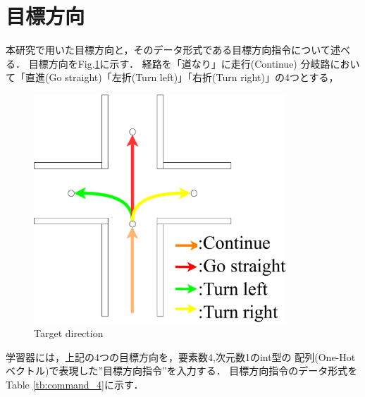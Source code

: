 \newpage
\section{目標方向}
本研究で用いた目標方向と，そのデータ形式である目標方向指令について述べる．
目標方向をFig.\ref{fig::cmd_4}に示す．
経路を「道なり」に走行(Continue)
分岐路において「直進(Go straight)「左折(Turn left)」「右折(Turn right)」の4つとする，
\begin{figure}[h]
  \centering
  \includegraphics[width = 9.5cm]{./figs/cmd_4.pdf}
  \caption{Target direction}
  \label{fig::cmd_4}
\end{figure}

学習器には，上記の4つの目標方向を，要素数4,次元数1のint型の
配列(One-Hot ベクトル)で表現した”目標方向指令”を入力する．
目標方向指令のデータ形式をTable \ref{tb:command_4}に示す．

